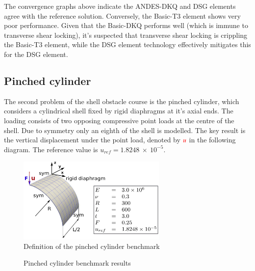 The convergence graphs above indicate the ANDES-DKQ and DSG elements agree with the reference solution. Conversely, the Basic-T3 element shows very poor performance. Given that the Basic-DKQ performs well (which is immune to transverse shear locking), it's suspected that transverse shear locking is crippling the Basic-T3 element, while the DSG element technology effectively mitigates this for the DSG element. 
\newpage
\subsection{Pinched cylinder}
%

The second problem of the shell obstacle course is the pinched cylinder, which considers a cylindrical shell fixed by rigid diaphragms at it's axial ends. The loading consists of two opposing compressive point loads at the centre of the shell. Due to symmetry only an eighth of the shell is modelled. The key result is the vertical displacement under the point load, denoted by $\textcolor{red}{u}$ in the following diagram. The reference value is $u_{ref} =  1.8248\ \times\ 10^{-5}$. 
 
 \begin{figure}[H]
 	\centering
 	\def\svgwidth{\columnwidth}
 	\includegraphics[width=7.3cm]{images/pinchedcylinder.png}
 	\caption{Definition of the pinched cylinder benchmark\cite{Bou13}}
 \end{figure}
 
\begin{figure}[H]
	\caption{\label{ref_label_overall}Pinched cylinder benchmark results}
\end{figure}


